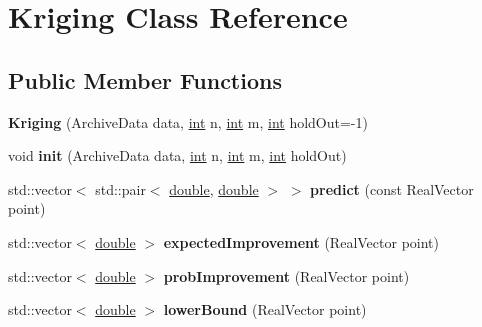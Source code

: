 \hypertarget{classKriging}{}\section{Kriging Class Reference}
\label{classKriging}
\subsection*{Public Member Functions}
\begin{DoxyCompactItemize}
\item 
{\bfseries Kriging} (Archive\+Data data, \hyperlink{classint}{int} n, \hyperlink{classint}{int} m, \hyperlink{classint}{int} hold\+Out=-\/1)\hypertarget{classKriging_a6a0bc3d6373a764628b51c0dfa91b8a9}{}\label{classKriging_a6a0bc3d6373a764628b51c0dfa91b8a9}

\item 
void {\bfseries init} (Archive\+Data data, \hyperlink{classint}{int} n, \hyperlink{classint}{int} m, \hyperlink{classint}{int} hold\+Out)\hypertarget{classKriging_ac25152d40758371e402465b589f8edf8}{}\label{classKriging_ac25152d40758371e402465b589f8edf8}

\item 
std\+::vector$<$ std\+::pair$<$ \hyperlink{classdouble}{double}, \hyperlink{classdouble}{double} $>$ $>$ {\bfseries predict} (const Real\+Vector point)\hypertarget{classKriging_a0c3b249f1bd6ed10ad5ea10657a85707}{}\label{classKriging_a0c3b249f1bd6ed10ad5ea10657a85707}

\item 
std\+::vector$<$ \hyperlink{classdouble}{double} $>$ {\bfseries expected\+Improvement} (Real\+Vector point)\hypertarget{classKriging_afeec3ae7a35c0a383d5f3e929c6b6014}{}\label{classKriging_afeec3ae7a35c0a383d5f3e929c6b6014}

\item 
std\+::vector$<$ \hyperlink{classdouble}{double} $>$ {\bfseries prob\+Improvement} (Real\+Vector point)\hypertarget{classKriging_aa1fb37c213d971172fca9e0dba55509e}{}\label{classKriging_aa1fb37c213d971172fca9e0dba55509e}

\item 
std\+::vector$<$ \hyperlink{classdouble}{double} $>$ {\bfseries lower\+Bound} (Real\+Vector point)\hypertarget{classKriging_aed720d0493bdf1cb80b911682ddb827b}{}\label{classKriging_aed720d0493bdf1cb80b911682ddb827b}

\end{DoxyCompactItemize}
